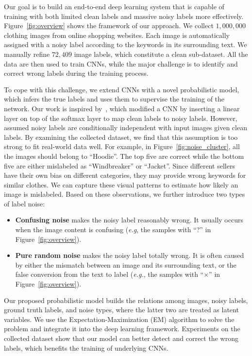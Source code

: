 \documentclass[extendedabs]{bmvc2k}
\begin{document}
Our goal is to build an end-to-end deep learning system that is capable of training with both limited clean labels and massive noisy labels more effectively. Figure~\ref{fig:overview} shows the framework of our approach. We collect $1,000,000$ clothing images from online shopping websites. Each image is automatically assigned with a noisy label according to the keywords in its surrounding text. We manually refine $72,409$ image labels, which constitute a clean sub-dataset. All the data are then used to train CNNs, while the major challenge is to identify and correct wrong labels during the training process.

To cope with this challenge, we extend CNNs with a novel probabilistic model, which infers the true labels and uses them to supervise the training of the network. Our work is inspired by~\cite{sukhbaatar2014learning}, which modified a CNN by inserting a linear layer on top of the softmax layer to map clean labels to noisy labels. However,~\cite{sukhbaatar2014learning} assumed noisy labels are conditionally independent with input images given clean labels. By examining the collected dataset, we find that this assumption is too strong to fit real-world data well. For example, in Figure~\ref{fig:noise_cluster}, all the images should belong to ``Hoodie''. The top five are correct while the bottom five are either mislabeled as ``Windbreaker'' or ``Jacket''. Since different sellers have their own bias on different categories, they may provide wrong keywords for similar clothes. We can capture these visual patterns to estimate how likely an image is mislabeled. Based on these observations, we further introduce two types of label noise:
\begin{itemize}
\item \textbf{Confusing noise} makes the noisy label reasonably wrong. It usually occurs when the image content is confusing (\emph{e.g}, the samples with ``?'' in Figure~\ref{fig:overview}).
\item \textbf{Pure random noise} makes the noisy label totally wrong. It is often caused by either the mismatch between an image and its surrounding text, or the false conversion from the text to label (\emph{e.g.}, the samples with ``$\times$'' in Figure~\ref{fig:overview}).
\end{itemize}

Our proposed probabilistic model builds the relations among images, noisy labels, ground truth labels, and noise types, where the latter two are treated as latent variables. We use the Expectation-Maximization (EM) algorithm to solve the problem and integrate it into the deep learning framework. Experiments on the collected dataset show that our model can better detect and correct the wrong labels, which benefits the training of underlying CNNs.
\end{document}
